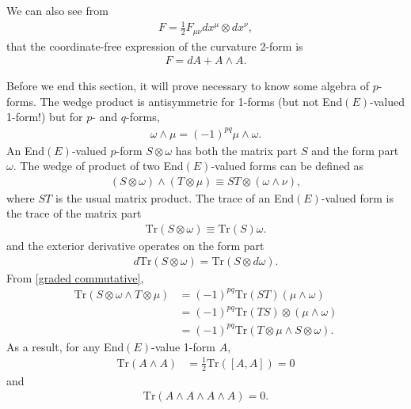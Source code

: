\documentclass[aps,nofootinbib]{revtex4}
\newcommand\Tr{\mathrm{Tr}}
\begin{document}
We can also see from
\begin{align}
F = \frac{1}{2} F_{\mu \nu} dx^{\mu} \otimes dx^{\nu},
\end{align}
that the coordinate-free expression of the curvature 2-form is
\begin{align}\label{curvature 2-form}
\boxed{ F = dA + A \wedge A }.
\end{align}

Before we end this section, it will prove necessary to know some algebra of $p$-forms. The wedge product is antisymmetric for 1-forms (but not End$(E)$-valued 1-form!) but for $p$- and $q$-forms,
\begin{align}\label{graded commutative}
\omega \wedge \mu = (-1)^{pq} \mu \wedge \omega.
\end{align}
An End$(E)$-valued $p$-form $S \otimes \omega$ has both the matrix part $S$ and the form part $\omega$. The wedge of product of two End$(E)$-valued forms can be defined as
\begin{align}
(S \otimes \omega) \wedge (T \otimes \mu) \equiv ST \otimes (\omega \wedge \nu),
\end{align}
where $ST$ is the usual matrix product. The trace of an End$(E)$-valued form is the trace of the matrix part
\begin{align}
\Tr (S \otimes \omega) \equiv \Tr (S) \omega.
\end{align}
and the exterior derivative operates on the form part
\begin{align}
d \Tr (S \otimes \omega) = \Tr (S \otimes d\omega).
\end{align}
From \eqref{graded commutative},
\begin{align}
\Tr (S \otimes \omega \wedge T \otimes \mu) &= (-1)^{pq} \Tr (ST) (\mu \wedge \omega) \nonumber \\
	&= (-1)^{pq} \Tr(TS) \otimes (\mu \wedge \omega) \nonumber \\
    &= (-1)^{pq} \Tr (T \otimes \mu \wedge S \otimes \omega). \label{graded cyclic}
\end{align}
As a result, for any End$(E)$-value 1-form $A$,
\begin{align}
\Tr (A \wedge A) &= \frac{1}{2} \Tr ([A,A]) = 0
\end{align}
and
\begin{align}\label{trace of A^4}
\Tr (A \wedge A \wedge A \wedge A) = 0.
\end{align}

\end{document}
